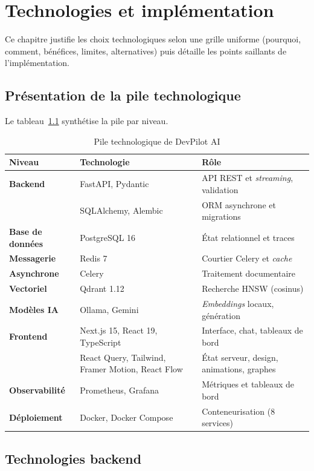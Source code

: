 \chapter{Technologies et implémentation}
\label{chap:techno}

Ce chapitre justifie les choix technologiques selon une grille uniforme
(pourquoi, comment, bénéfices, limites, alternatives) puis détaille les points
saillants de l'implémentation.

\section{Présentation de la pile technologique}
Le tableau~\ref{tab:stack} synthétise la pile par niveau.

\begin{table}[H]
\centering\caption{Pile technologique de DevPilot AI}\label{tab:stack}\small
\begin{tabularx}{\textwidth}{@{}>{\bfseries}l l X@{}}
\toprule
Niveau & Technologie & Rôle \\
\midrule
Backend & FastAPI, Pydantic & API REST et \emph{streaming}, validation \\
 & SQLAlchemy, Alembic & ORM asynchrone et migrations \\
Base de données & PostgreSQL 16 & État relationnel et traces \\
Messagerie & Redis 7 & Courtier Celery et \emph{cache} \\
Asynchrone & Celery & Traitement documentaire \\
Vectoriel & Qdrant 1.12 & Recherche HNSW (cosinus) \\
Modèles IA & Ollama, Gemini & \emph{Embeddings} locaux, génération \\
Frontend & Next.js 15, React 19, TypeScript & Interface, chat, tableaux de bord \\
 & React Query, Tailwind, Framer Motion, React Flow & État serveur, design, animations, graphes \\
Observabilité & Prometheus, Grafana & Métriques et tableaux de bord \\
Déploiement & Docker, Docker Compose & Conteneurisation (8 services) \\
\bottomrule
\end{tabularx}
\end{table}

\section{Technologies backend}

